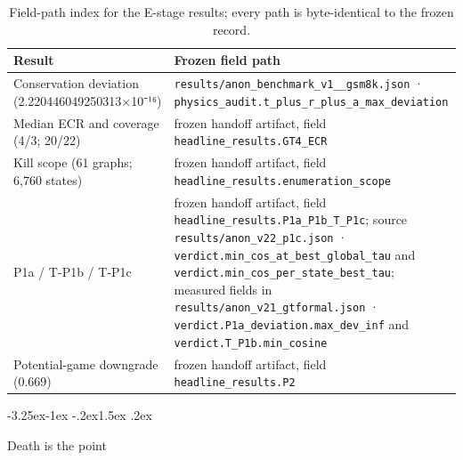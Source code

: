 \documentclass[11pt,a4paper]{article}
\makeatletter
\renewcommand\subsection{\@startsection{subsection}{2}{\z@}%
  {-3.25ex\@plus -1ex \@minus -.2ex}{1.5ex \@plus .2ex}%
  {\normalfont\large\bfseries\raggedright}}
\makeatother
\begin{document}
\begin{table}[htbp]
\centering
\small
\setlength{\tabcolsep}{4pt}
\renewcommand{\arraystretch}{1.15}
\begin{tabularx}{0.985\textwidth}{@{}>{\raggedright\arraybackslash}p{}>{\raggedright\arraybackslash}X@{}}
\toprule
\textbf{Result} & \textbf{Frozen field path} \\
\midrule
Conservation deviation (2.220446049250313×10⁻¹⁶) & \texttt{results/\allowbreak anon\_\allowbreak benchmark\_\allowbreak v1\_\allowbreak 4\_\allowbreak gsm8k.json} · \texttt{physics\_\allowbreak audit.t\_\allowbreak plus\_\allowbreak r\_\allowbreak plus\_\allowbreak a\_\allowbreak max\_\allowbreak deviation} \\
Median ECR and coverage (4/3; 20/22) & frozen handoff artifact, field \texttt{headline\_\allowbreak results.GT4\_\allowbreak ECR} \\
Kill scope (61 graphs; 6,760 states) & frozen handoff artifact, field \texttt{headline\_\allowbreak results.enumeration\_\allowbreak scope} \\
P1a / T-P1b / T-P1c & frozen handoff artifact, field \texttt{headline\_\allowbreak results.P1a\_\allowbreak P1b\_\allowbreak T\_\allowbreak P1c}; source \texttt{results/\allowbreak anon\_\allowbreak v22\_\allowbreak p1c.json} · \texttt{verdict.min\_\allowbreak cos\_\allowbreak at\_\allowbreak best\_\allowbreak global\_\allowbreak tau} and \texttt{verdict.min\_\allowbreak cos\_\allowbreak per\_\allowbreak state\_\allowbreak best\_\allowbreak tau}; measured fields in \texttt{results/\allowbreak anon\_\allowbreak v21\_\allowbreak gtformal.json} · \texttt{verdict.P1a\_\allowbreak deviation.max\_\allowbreak dev\_\allowbreak inf} and \texttt{verdict.T\_\allowbreak P1b.min\_\allowbreak cosine} \\
Potential-game downgrade (0.669) & frozen handoff artifact, field \texttt{headline\_\allowbreak results.P2} \\
\bottomrule
\end{tabularx}
\caption{Field-path index for the E-stage results; every path is byte-identical to the frozen record.}
\label{tab:fieldpathsE}
\end{table}

\subsection{Death is the point}
\end{document}

